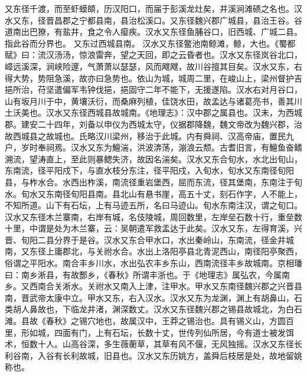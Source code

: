 \documentclass[12pt,UTF8]{ctexbook}
\begin{document}
又东径千渡，而至虾蟆頧，历汉阳口，而届于彭溪龙灶矣，并溪涧滩碛之名也。汉水又东，径晋昌郡之宁都县南，县治松溪口。又东径魏兴郡广城县，县治王谷。谷道南出巴獠，有盐井，食之令人瘿疾。汉水又东径鱼脯谷口，旧西城、广城二县。指此谷而分界也。
又东过西城县南。
汉水又东径鳖池南鲸滩，鲸，大也。《蜀都赋》曰：流汉汤汤，惊浪雷奔，望之天回，即之云昏者也。汉水又东径岚谷北口，嶂远溪深，涧峡险邃，气萧萧以瑟瑟，风而飕飕，故川谷擅其目矣。汉水又东，右得大势，势阻急溪，故亦曰急势也。依山为城，城周二里，在峻山上，梁州督护吉挹所治，苻坚遣偏军韦钟伐挹，挹固守二年不能下，无援遂陷。汉水右对月谷口，山有坂月川于中，黄壤沃衍，而桑麻列植，佳饶水田，故孟达与诸葛亮书，善其川土沃美也。汉水又东径西城县故城南。《地理志》：汉中郡之属县也。汉未，为西城郡。建安二十四年，刘备以申仪为西城太守，仪据郡降魏，魏文帝改为魏兴郡，治故西城县之故城也。氏略汉川梁州，移治于此城。内有舜祠、汉高帝庙，置民九户，岁时奉祠焉。汉水又东为鱣湍，洪波渀荡，漰浪云颓。古耆旧言，有鱣鱼奋鳍溯流，望涛直上，至此则暴鳃失济，故因名湍矣。汉水又东合旬水，水北出旬山，东南流，径平阳戍下，与直水枝分东注，径平阳戍，入旬水，旬水又东南径旬阳县，与柞水合。水西出柞溪，南流径重岩堡西，屈而东流，径其堡南，东南注于旬水。旬水又东南径旬阳县南。县北山有悬书崖，高五十丈，刻石作字，人不能上，不知所道。山下有石坛，上有马迹五所，名曰马迹山。旬水东南注汉，谓之旬口。汉水又东径木兰寨南，右岸有城，名伎陵城，周回数里，左岸垒石数十行，重垒数十里，中谓是处为木兰寨，云：吴朝遣军救盂达于此矣。汉水又东，左得育溪，兴晋、旬阳二县分界于是谷。汉水又东合甲水口，水出秦岭山，东南流，径金井城南，又东径上庸郡北，与关祔水合。水出上洛阳亭县北青泥西山，南径阳亭聚西，俗谓之平阳水。南合丰乡川水，水出弘农丰乡东山，西南流径丰乡故城南。京相璠曰：南乡淅县，有故酆乡，《春秋》所谓丰浙也。于《地理志》属弘农，今属南乡。又西南合关淅水。关祔水又南入上津，注甲水。甲水又东南径魏兴郡之兴晋县南，晋武帝太康中立。甲水又东，右入汉水。汉水又东为龙渊，渊上有胡鼻山，石类胡人鼻故也，下临龙井渚，渊深数丈。汉水又东径魏兴郡之锡县故城北，为白石滩。县故《春秋》之锡穴地也，故属汉中，王莽之锡治也。具有锡义山，方圆百里，形如城，四面有门，上有石坛，长数十丈，世传列仙所居，今有道士被发饵术，恒数十人。山高谷深，多生薇蘅草，其草有风不偃，无风独摇。汉水又东径长利谷南，入谷有长利故城，旧县也。汉水又东历姚方，盖舜后枝居是处，故地留姚称也。
\end{document}
